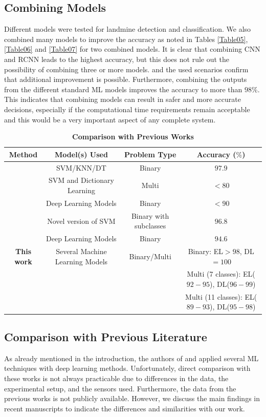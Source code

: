 \documentclass{ieeeaccess}
\begin{document}
\subsection{Combining Models}
Different models were tested for landmine detection and classification. We also combined many models to improve the accuracy as noted in Tables \ref{Table05}, \ref{Table06} and \ref{Table07} for two combined models. It is clear that combining CNN and RCNN leads to the highest accuracy, but this does not rule out the possibility of combining three or more models. and the used scenarios confirm that additional improvement is possible. Furthermore, combining the outputs from the different standard ML models improves the accuracy to more than $98\%$. This indicates that combining models can result in safer and more accurate decisions, especially if the computational time requirements remain acceptable and this would be a very important aspect of any complete system.


\begin{table}[t]
\caption{\textbf{Comparison with Previous Works}}
\label{Table08}
\setlength{\tabcolsep}{3pt}
\begin{center}
\begin{tabular}{|c|c|c|c|}
\hline
\textbf{Method}	& \textbf{Model(s) Used}	& \textbf{Problem Type}	& \textbf{Accuracy ($\%$)} \\
\hline \hline
\cite{Abeynayake2019} &	SVM/KNN/DT	& Binary	& $97.9$ \\ \hline
\cite{Giovanneschi2019} & SVM and Dictionary Learning	& Multi	& $<80$ \\ \hline
\cite{Moalla2020} &	Deep Learning Models	& Binary	& $<90$ \\ \hline
\cite{Tbarki2021} & Novel version of SVM & Binary with subclasses & $96.8$ \\ \hline
\cite{Wang2022} & 	Deep Learning Models	& Binary	& $94.6$ \\ \hline
\textbf{This work} & Several Machine Learning Models	& Binary/Multi	& Binary: EL$>98$, DL$=100$ \\ 
& & & Multi (7 classes): EL($92-95$), DL($96-99$) \\
& & & Multi (11 classes): EL($89-93$), DL($95-98$) \\
\hline
\end{tabular}
\end{center}
\end{table}


\subsection{Comparison with Previous Literature}
As already mentioned in the introduction, the authors of \cite{Travassos2020} and \cite{Moalla2020} applied several ML techniques with deep learning methods. Unfortunately, direct comparison with these works is not always practicable due to differences in the data, the experimental setup, and the sensors used. Furthermore, the data from the previous works is not publicly available. However, we discuss the main findings in recent manuscripts to indicate the differences and similarities with our work. 
\end{document}
